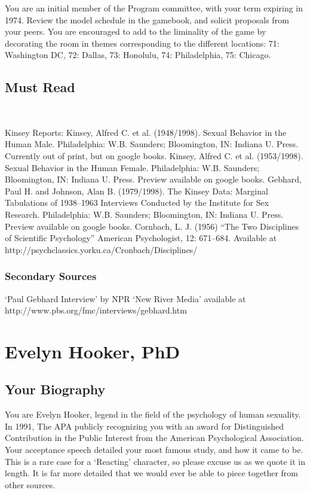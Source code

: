 \begin{refsection}
You are an initial member of the Program committee, with your term expiring in 1974. Review the model schedule in the gamebook, and solicit proposals from your peers. You are encouraged to add to the liminality of the game by decorating the room in themes corresponding to the different locations: 71: Washington DC, 72: Dallas, 73: Honolulu, 74: Philadelphia, 75: Chicago.

\section{Must Read}
\label{mustread}

~\citep{Mead:1928uk}

Kinsey Reports:
Kinsey, Alfred C. et al. (1948\slash 1998). Sexual Behavior in the Human Male. Philadelphia: W.B. Saunders; Bloomington, IN: Indiana U. Press. Currently out of print, but on google books.
Kinsey, Alfred C. et al. (1953\slash 1998). Sexual Behavior in the Human Female. Philadelphia: W.B. Saunders; Bloomington, IN: Indiana U. Press. Preview available on google books.
Gebhard, Paul H. and Johnson, Alan B. (1979\slash 1998). The Kinsey Data: Marginal Tabulations of 1938--1963 Interviews Conducted by the Institute for Sex Research. Philadelphia: W.B. Saunders; Bloomington, IN: Indiana U. Press. Preview available on google books.
Cornbach, L. J. (1956) ``The Two Disciplines of Scientific Psychology'' American Psychologist, 12: 671--684. Available at http:\slash \slash psychclassics.yorku.ca\slash Cronbach\slash Disciplines\slash 

\subsection{Secondary Sources}
\label{secondarysources}

`Paul Gebhard Interview' by NPR `New River Media' available at http:\slash \slash www.pbs.org\slash fmc\slash interviews\slash gebhard.htm

\chapter{Evelyn Hooker, PhD}
\label{evelynhookerphd}

\section{Your Biography}
\label{yourbiography}

You are Evelyn Hooker, legend in the field of the psychology of human sexuality. In 1991, The APA publicly recognizing you with an award for Distinguished Contribution in the Public Interest from the American Psychological Association. Your acceptance speech detailed your most famous study, and how it came to be. This is a rare case for a `Reacting' character, so please excuse us as we quote it in length. It is far more detailed that we would ever be able to piece together from other sources.


\end{refsection}
